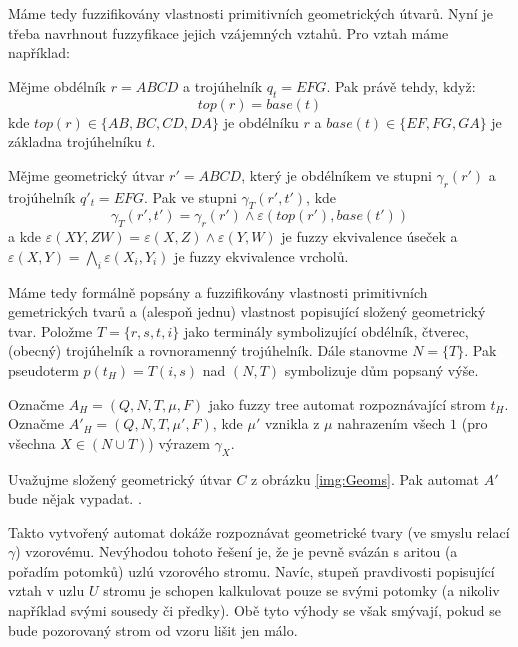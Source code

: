 \documentclass[a4paper,10pt]{article}
\begin{document}
Máme tedy fuzzifikovány vlastnosti primitivních geometrických útvarů. Nyní je třeba navrhnout fuzzyfikace jejich vzájemných vztahů. Pro vztah  máme například:

\begin{definition}
 Mějme obdélník $r = A B C D$ a trojúhelník $q_t = E F G$. Pak  právě tehdy, když:
 $$
  top(r) = base(t)
 $$
 kde $top(r) \in \{ AB, BC, CD, DA \}$ je  obdélníku $r$ a $base(t) \in \{ EF, FG, GA \}$ je základna trojúhelníku $t$.
 
 Mějme geometrický útvar $r' = A B C D$, který je obdélníkem ve stupni $\gamma_r(r')$ a trojúhelník $q'_t = E F G$. Pak  ve stupni $\gamma_T(r', t')$, kde
 $$
  \gamma_T(r', t') = \gamma_r(r') \wedge \varepsilon(top(r'), base(t'))
 $$
 a kde $\varepsilon(XY, ZW) = \varepsilon(X, Z) \wedge \varepsilon(Y, W)$ je fuzzy ekvivalence úseček a $\varepsilon(X, Y) = \bigwedge_{i} \varepsilon(X_i, Y_i)$ je fuzzy ekvivalence vrcholů.
\end{definition}

Máme tedy formálně popsány a fuzzifikovány vlastnosti primitivních gemetrických tvarů a (alespoň jednu) vlastnost popisující složený geometrický tvar. Položme $T = \{ r, s, t, i \}$ jako terminály symbolizující obdélník, čtverec, (obecný) trojúhelník a rovnoramenný trojúhelník. Dále stanovme $N = \{ T \}$. Pak pseudoterm $p(t_H) = T(i, s)$ nad $(N, T)$ symbolizuje dům popsaný výše.

Označme $A_H = (Q, N, T, \mu, F)$ jako fuzzy tree automat rozpoznávající strom $t_H$. Označme $A'_H = (Q, N, T, \mu', F)$, kde $\mu'$ vznikla z $\mu$ nahrazením všech $1$ (pro všechna $X \in (N \cup T)$) výrazem $\gamma_X$.

\begin{example}
 Uvažujme složený geometrický útvar $C$ z obrázku \ref{img:Geoms}. Pak automat $A'$ bude nějak vypadat. .
\end{example}

Takto vytvořený automat dokáže rozpoznávat geometrické tvary  (ve smyslu relací $\gamma$) vzorovému. Nevýhodou tohoto řešení je, že je pevně svázán s aritou (a pořadím potomků) uzlú vzorového stromu. Navíc, stupeň pravdivosti popisující vztah v uzlu $U$ stromu je schopen kalkulovat pouze se svými potomky (a nikoliv například svými sousedy či předky). Obě tyto výhody se však smývají, pokud se bude pozorovaný strom od vzoru lišit jen málo.
\end{document}
